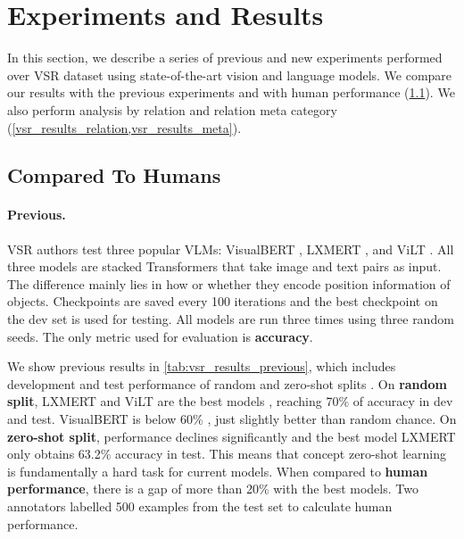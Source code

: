 \section{Experiments and Results} \label{sec:vsr_experiments_results}

In this section, we describe a series of previous and new experiments performed over VSR dataset using state-of-the-art vision and language models. We compare our results with the previous experiments and with human performance (\cref{sec:vsr_results_humans}). We also perform analysis by relation and relation meta category (\cref{vsr_results_relation,vsr_results_meta}).

\subsection{Compared To Humans} \label{sec:vsr_results_humans}

\paragraph{Previous.}
VSR authors \cite{liu2022visual} test three popular VLMs: VisualBERT \cite{li2019visualbert}, LXMERT \cite{tan2020lxmert}, and
ViLT \cite{kim2021vilt}. All three models are stacked Transformers \cite{vaswani2017attention} that take image and text pairs as input. The difference mainly lies in how or whether they encode position information of objects. Checkpoints are saved every 100 iterations and the best checkpoint on the dev set is used for testing. All models are run three times using three random seeds. The only metric used for evaluation is \textbf{accuracy}.

We show previous results in \cref{tab:vsr_results_previous}, which includes development and test performance of random and zero-shot splits \cite{liu2022visual}. On \textbf{random split}, LXMERT and ViLT are the best models , reaching 70\% of accuracy in dev and test. VisualBERT is below 60\% , just slightly better than random chance. On \textbf{zero-shot split}, performance declines significantly and the best model LXMERT only obtains 63.2\% accuracy in test. This means that concept zero-shot learning is fundamentally a hard task for current models. When compared to \textbf{human performance}, there is a gap of more than 20\% with the best models. Two annotators labelled 500 examples from the test set to calculate human performance.

